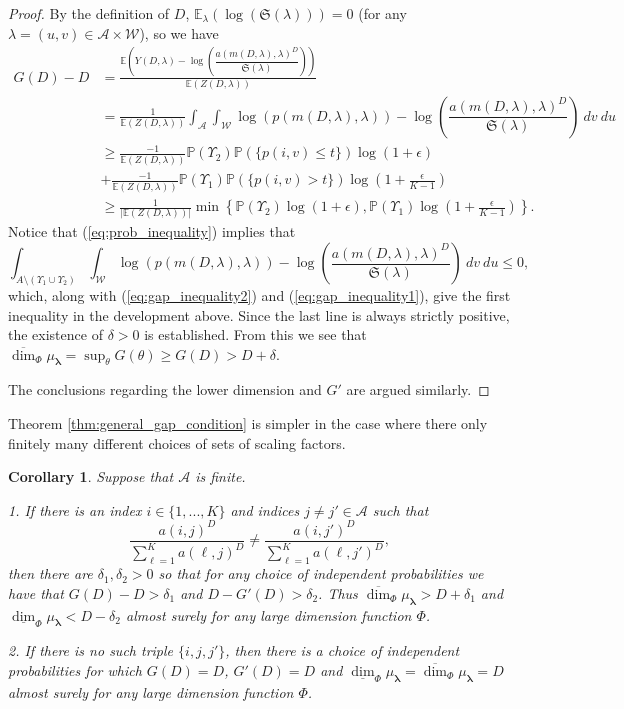 \documentclass{amsart}
\newtheorem{corollary}[theorem]{Corollary}
\theoremstyle{plain}
\numberwithin{equation}{section}
\renewcommand{\P}{{\mathbb P}}
\newcommand{\cA}{{\mathcal A}}
\newcommand{\cW}{{\mathcal W}}
\newcommand{\blambda}{{\boldsymbol{\lambda}}}
\newcommand{\mfS}{\mathfrak{S}}
\newcommand{\ee}{{\mathbb E}}
\newcommand{\odim}{\overline{\dim}}
\newcommand{\udim}{\underline{\dim}}
\begin{document}
\begin{proof}
By the definition of $D$, $\ee_\lambda(\log(\mfS(\lambda))) = 0$ (for any $\lambda = (u,v) \in \cA \times \cW$), so we have
\begin{align*}
        G(D)-D& =\frac{\ee\left(Y(D,\lambda)-\log \left( \dfrac{a(m(D,\lambda),\lambda)^{D}}{\mfS(\lambda)}\right) \right)}{\ee(Z(D,\lambda))}
\\[8pt]
      & =\frac{1}{\ee(Z(D,\lambda))}\int_{\cA}\int_{\cW}\log (p(m(D,\lambda),\lambda))-\log \left( \dfrac{a(m(D,\lambda),\lambda)^{D}}{\mfS(\lambda)}\right) \ dv\ du
\\[8pt]
      & \geq \frac{-1}{\ee(Z(D,\lambda))}\P(\Upsilon_{2})\P(\{p(i,v)\leq t\})\log (1+\epsilon) \\[8pt]
      & +\frac{-1}{\ee(Z(D,\lambda))}\P(\Upsilon_{1})\P(\{p(i,v)>t\})\log (1+\frac{\epsilon}{K-1}) \\[8pt]
      & \geq \frac{1}{\left| \ee(Z(D,\lambda))\right|}\min \left\{ \P(\Upsilon_{2})\log (1+\epsilon),\P(\Upsilon_{1})\log (1+\frac{\epsilon}{K-1})\right\}.
\end{align*}
Notice that (\ref{eq:prob_inequality}) implies that 
\[
    \int_{A \setminus (\Upsilon_1 \cup \Upsilon_2)} \int_\cW \log (p(m(D,\lambda),\lambda))-\log \left( \dfrac{a(m(D,\lambda),\lambda)^{D}}{\mfS(\lambda)}\right) \ dv\ du \le 0,
\]
which, along with (\ref{eq:gap_inequality2}) and (\ref{eq:gap_inequality1}), give the first inequality in the development above.
Since the last line is always strictly positive, the existence of $\delta >0$ is established. 
From this we see that $\odim_{\Phi}\mu_\blambda=\sup_{\theta}G(\theta)\geq G(D)>D+\delta$.

The conclusions regarding the lower dimension and $G'$ are argued similarly.
\end{proof}

Theorem \ref{thm:general_gap_condition} is simpler in the case where there only finitely many different choices of sets of scaling factors. 


\begin{corollary} \label{cor:gap_finite} 
Suppose that $\cA$ is finite. 

1. If there is an index $i\in \{1,...,K\}$ and indices $j\neq j'\in \cA$ such that 
\begin{equation*}
     \frac{a(i,j)^{D}}{\sum_{\ell =1}^K a(\ell ,j)^{D}}\neq \frac{a(i,j')^{D}}{\sum_{\ell =1}^K a(\ell ,j')^{D}},
\end{equation*}%
then there are $\delta_1, \delta_2 >0$ so that for any choice of independent
probabilities we have that $G(D)-D>\delta_1$ and $D - G'(D) > \delta_2$.
Thus $\odim_\Phi \mu_\blambda>D+\delta_1$ and $\udim_\Phi \mu_\blambda < D - \delta_2$
almost surely for any large dimension function $\Phi$.

\smallskip

2. If there is no such triple $\{i,j,j'\}$, then there is a choice
of independent probabilities for which $G(D)=D$, $G'(D) = D$ and $\udim_\Phi \mu_\blambda = \odim_\Phi \mu_\blambda=D$ almost surely for any large dimension
function $\Phi$.
\end{corollary}
\end{document}
